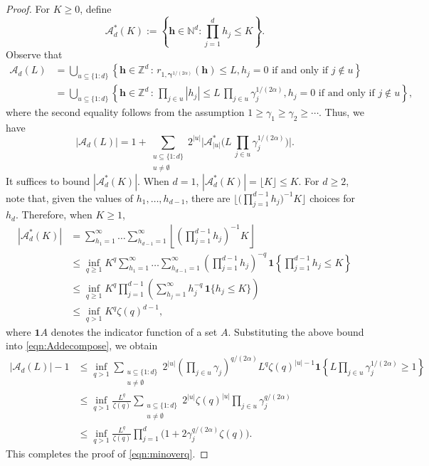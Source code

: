 \documentclass[10pt,a4paper]{amsart}
\newcommand{\Acal}{\mathcal{A}}
\newcommand{\NN}{\mathbb{N}}
\newcommand{\ZZ}{\mathbb{Z}}
\newcommand{\bsgamma}{\boldsymbol{\gamma}}
\newcommand{\bsh}{\boldsymbol{h}}
\newcommand{\bsone}{\boldsymbol{1}}
\begin{document}
\begin{proof} 
For $K\geq 0$, define
\[ 
\Acal^*_d(K) :=\left\{\bsh\in \NN^d : \prod_{j=1}^d h_j \leq  K\right\}.
\]
Observe that
\begin{align*}
    \Acal_d(L)&=\bigcup_{u\subseteq \{1{:}d\}}\left\{\bsh\in \ZZ^d \, \colon\, r_{1, \bsgamma^{1/(2\alpha)}}(\bsh) \leq L,h_j=0 \text{ if and only if }j\notin u\right\}\\
    &=\bigcup_{u\subseteq \{1{:}d\}}\left\{\bsh\in \ZZ^d \, \colon\,  \prod_{j\in u} |h_j| \leq L\,\prod_{j\in u} \gamma_j^{1/(2\alpha)},h_j=0 \text{ if and only if }j\notin u\right\},
\end{align*}
where the second equality follows from the assumption $1\ge \gamma_1 \ge \gamma_2 \ge \cdots$. 
Thus, we have
\begin{equation}\label{eqn:Addecompose}
    |\Acal_d(L)|=1+\sum_{\substack{u\subseteq \{1{:}d\}\\u\neq\emptyset}} 2^{|u|} \Big|\Acal^*_{|u|}\Big(L\,\prod_{j\in u} \gamma_j^{1/(2\alpha)}\Big)\Big|. 
\end{equation}
It suffices to bound $|\Acal^*_d(K)|$. When $d=1$, $|\Acal^*_d(K)|=\lfloor K\rfloor\leq K$. For $d\ge 2$, note that, given the values of $h_1,\dots,h_{d-1}$, there are $\Big\lfloor \Big(\prod_{j=1}^{d-1}h_j\Big)^{-1}K\Big\rfloor$ choices for $h_d$. 
Therefore, when $K\geq 1$,
\begin{align}\label{eqn:Adstarbound}
    |\Acal^*_d(K)|&=\sum_{h_1=1}^\infty \dots \sum_{h_{d-1}=1}^\infty \left\lfloor \left(\prod_{j=1}^{d-1}h_j\right)^{-1}K\right\rfloor\nonumber \\
    &\leq \inf_{q\geq 1} K^q\sum_{h_1=1}^\infty \dots \sum_{h_{d-1}=1}^\infty  \left(\prod_{j=1}^{d-1}h_j\right)^{-q}\,\bsone\left\{\prod_{j=1}^{d-1}h_j\leq K\right\}\nonumber\\
    &\leq \inf_{q\geq 1} K^q \prod_{j=1}^{d-1}\left(\sum_{h_j=1}^\infty h_j^{-q}\,\bsone\{h_j\leq K\}\right) \\
    &\leq \inf_{q> 1} K^q \zeta(q)^{d-1}, \nonumber
\end{align}
where $\bsone A$ denotes 
the indicator function of a set $A$. 
Substituting the above bound into \eqref{eqn:Addecompose}, we obtain
\begin{align}\label{eqn:Adboundsumu}
    |\Acal_d(L)|-1&\leq \inf_{q>1}  \sum_{\substack{u\subseteq \{1{:}d\}\\u\neq \emptyset}} 2^{|u|} \left(\prod_{j\in u} \gamma_j\right)^{q/(2\alpha)} L^q \zeta(q)^{|u|-1}\bsone\left\{L\prod_{j\in u} \gamma_j^{1/(2\alpha)} \ge 1\right\}\\
    & \leq   \inf_{q>1}  \frac{L^q}{\zeta(q)} \sum_{\substack{u\subseteq \{1{:}d\}\\u\neq \emptyset}} 2^{|u|} 
    \zeta(q)^{|u|} \prod_{j\in u} \gamma_j^{q/(2\alpha)} \nonumber\\
    &\le \inf_{q>1}  \frac{L^{q}}{\zeta(q)} \prod_{j=1}^d \Big(1+2\gamma^{q/(2\alpha)}_j \zeta(q)\Big).\nonumber
\end{align}
This completes the proof of \eqref{eqn:minoverq}.


\end{proof}
\end{document}
